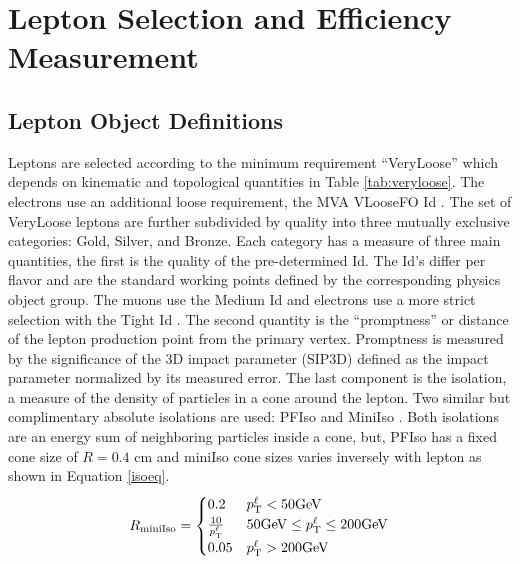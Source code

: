 \chapter{Lepton Selection and Efficiency Measurement}

\section{Lepton Object Definitions}


Leptons are selected according to the minimum requirement ``VeryLoose'' which depends on kinematic and topological quantities in Table \ref{tab:veryloose}. The electrons use an additional loose requirement, the MVA VLooseFO Id \cite{elecMVA}. The set of VeryLoose leptons are further subdivided by quality into three mutually exclusive categories: Gold, Silver, and Bronze. Each category has a measure of three main quantities, the first is the quality of the pre-determined Id. The Id's differ per flavor and are the standard working points defined by the corresponding physics object group. The muons use the Medium Id \cite{muMediumId} and electrons use a more strict selection with the Tight Id \cite{eTightID}. The second quantity is the ``promptness'' or distance of the lepton production point from the primary vertex. Promptness is measured by the significance of the 3D impact parameter (SIP3D) defined as the impact parameter normalized by its measured error. The last component is the isolation, a measure of the density of particles in a cone around the lepton. Two similar but complimentary absolute isolations are used: PFIso \cite{murun2baseline} and MiniIso \cite{miniIso}. Both isolations are an energy sum of neighboring particles inside a cone, but, PFIso has a fixed cone size of $R=0.4$ cm  and miniIso cone sizes varies inversely with lepton \pt as shown in Equation \ref{isoeq}.
\begin{equation}
R_{\text{miniIso}}=
    \begin{cases}
      0.2 & p_{\mathrm{T}}^\ell < 50 \text{GeV}\\
      \frac{10}{p_{\mathrm{T}}^\ell} & 50 \text{GeV} \leq p_{\mathrm{T}}^\ell \leq 200 \text{GeV} \\
      0.05 & p_{\mathrm{T}}^\ell > 200 \text{GeV}
    \end{cases}
    \label{isoeq}
\end{equation}

